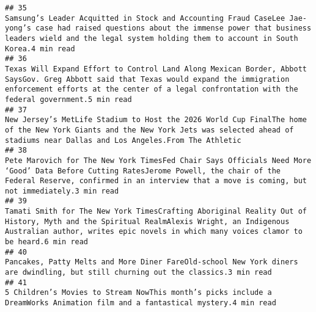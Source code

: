 \documentclass[
]{article}
\begin{document}
\begin{verbatim}
## 35                                                                                                                                                                                      Samsung’s Leader Acquitted in Stock and Accounting Fraud CaseLee Jae-yong’s case had raised questions about the immense power that business leaders wield and the legal system holding them to account in South Korea.4 min read
## 36                                                                                                                                                                             Texas Will Expand Effort to Control Land Along Mexican Border, Abbott SaysGov. Greg Abbott said that Texas would expand the immigration enforcement efforts at the center of a legal confrontation with the federal government.5 min read
## 37                                                                                                                                                                                                                       New Jersey’s MetLife Stadium to Host the 2026 World Cup FinalThe home of the New York Giants and the New York Jets was selected ahead of stadiums near Dallas and Los Angeles.From The Athletic
## 38                                                                                                                                                                               Pete Marovich for The New York TimesFed Chair Says Officials Need More ‘Good’ Data Before Cutting RatesJerome Powell, the chair of the Federal Reserve, confirmed in an interview that a move is coming, but not immediately.3 min read
## 39                                                                                                                                                                                     Tamati Smith for The New York TimesCrafting Aboriginal Reality Out of History, Myth and the Spiritual RealmAlexis Wright, an Indigenous Australian author, writes epic novels in which many voices clamor to be heard.6 min read 
## 40                                                                                                                                                                                                                                                                                     Pancakes, Patty Melts and More Diner FareOld-school New York diners are dwindling, but still churning out the classics.3 min read
## 41                                                                                                                                                                                                                                                                                          5 Children’s Movies to Stream NowThis month’s picks include a DreamWorks Animation film and a fantastical mystery.4 min read

\end{verbatim}
\end{document}
